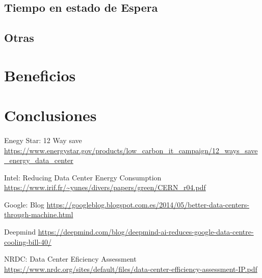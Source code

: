 \documentclass[10pt]{article}
\begin{document}
		\subsection{Tiempo en estado de Espera}

			\paragraph{}


		\subsection{Otras}

			\paragraph{}


    \section{Beneficios}
	\label{sec:beneficios}

    	\paragraph{}

    \section{Conclusiones}
	\label{sec:conclusiones}

    	\paragraph{}
	\clearpage
    \begin{thebibliography}{9}

  		Enegy Star: 12 Way save \url{https://www.energystar.gov/products/low_carbon_it_campaign/12_ways_save_energy_data_center}

        Intel: Reducing Data Center Energy Consumption \url{https://www.irif.fr/~yunes/divers/papers/green/CERN_r04.pdf}

        Google: Blog \url{https://googleblog.blogspot.com.es/2014/05/better-data-centers-through-machine.html}

        Deepmind \url{https://deepmind.com/blog/deepmind-ai-reduces-google-data-centre-cooling-bill-40/}

        NRDC: Data Center Eficiency Assessment \url{https://www.nrdc.org/sites/default/files/data-center-efficiency-assessment-IP.pdf}

	\end{thebibliography}
\end{document}
